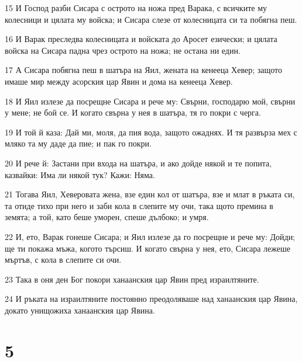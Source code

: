 \par 15 И Господ разби Сисара с острото на ножа пред Варака, с всичките му колесници и цялата му войска; и Сисара слезе от колесницата си та побягна пеш.
\par 16 И Варак преследва колесницата и войската до Аросет езически; и цялата войска на Сисара падна чрез острото на ножа; не остана ни един.
\par 17 А Сисара побягна пеш в шатъра на Яил, жената на кенееца Хевер; защото имаше мир между асорския цар Явин и дома на кенееца Хевер.
\par 18 И Яил излезе да посрещне Сисара и рече му: Свърни, господарю мой, свърни у мене; не бой се. И когато свърна у нея в шатъра, тя го покри с черга.
\par 19 И той й каза: Дай ми, моля, да пия вода, защото ожаднях. И тя развърза мех с мляко та му даде да пие; и пак го покри.
\par 20 И рече й: Застани при входа на шатъра, и ако дойде някой и те попита, казвайки: Има ли някой тук? Кажи: Няма.
\par 21 Тогава Яил, Хеверовата жена, взе един кол от шатъра, взе и млат в ръката си, та отиде тихо при него и заби кола в слепите му очи, така щото премина в земята; а той, като беше уморен, спеше дълбоко; и умря.
\par 22 И, ето, Варак гонеше Сисара; и Яил излезе да го посрещне и рече му: Дойди; ще ти покажа мъжа, когото търсиш. И когато свърна у нея, ето, Сисара лежеше мъртъв, с кола в слепите си очи.
\par 23 Така в оня ден Бог покори ханаанския цар Явин пред израилтяните.
\par 24 И ръката на израилтяните постоянно преодоляваше над ханаанския цар Явина, докато унищожиха ханаанския цар Явина.

\chapter{5}

